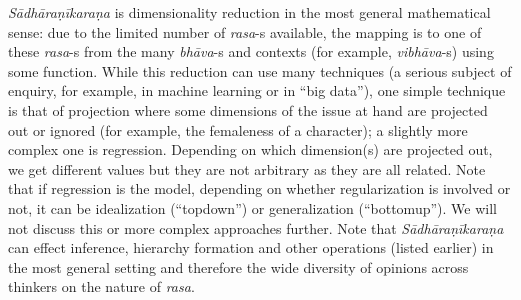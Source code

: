 \textsl{Sādhāraṇīkaraṇa} is dimensionality reduction in the most general mathematical sense: due to the limited number of \textsl{rasa}-s available, the mapping is to one of these \textsl{rasa}-s from the many \textsl{bhāva}-s and contexts (for example, \textsl{vibhāva}-s) using some function. While this reduction can use many techniques (a serious subject of enquiry, for example, in machine learning or in “big data”), one simple technique is that of projection where some dimensions of the issue at hand are projected out or ignored (for example, the femaleness of a character); a slightly more complex one is regression. Depending on which dimension(s) are projected out, we get different values but they are not arbitrary as they are all related. Note that if regression is the model, depending on whether regularization is involved or not, it can be idealization (“topdown”) or generalization (“bottomup”). We will not discuss this or more complex approaches further. Note that \textsl{Sādhāraṇīkaraṇa} can effect inference, hierarchy formation and other operations (listed earlier) in the most general setting and therefore the wide diversity of opinions across thinkers on the nature of \textsl{rasa}.


\newpage

